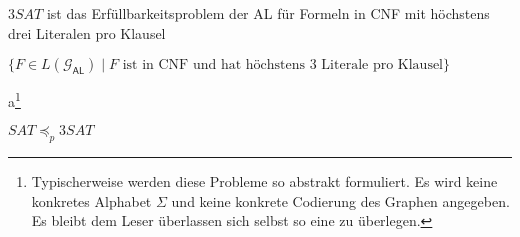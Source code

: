 \begin{Def}[name={[$3SAT$]}]
	$3SAT$ ist das Erfüllbarkeitsproblem der \ac{AL} für Formeln in \ac{CNF} mit höchstens drei Literalen pro Klausel
	
	$\{F\in L(\mathcal{G}_\mathsf{AL})\mid F \text{ ist in CNF und hat höchstens 3 Literale pro Klausel}\}$
\end{Def}

\begin{center}
\end{center}

a\footnote{Typischerweise werden diese Probleme so abstrakt formuliert. Es wird keine konkretes Alphabet $\Sigma$ und keine konkrete Codierung des Graphen angegeben. Es bleibt dem Leser überlassen sich selbst so eine zu überlegen.}
\begin{lemma}
	$SAT \preceq_p 3SAT$
\end{lemma}


